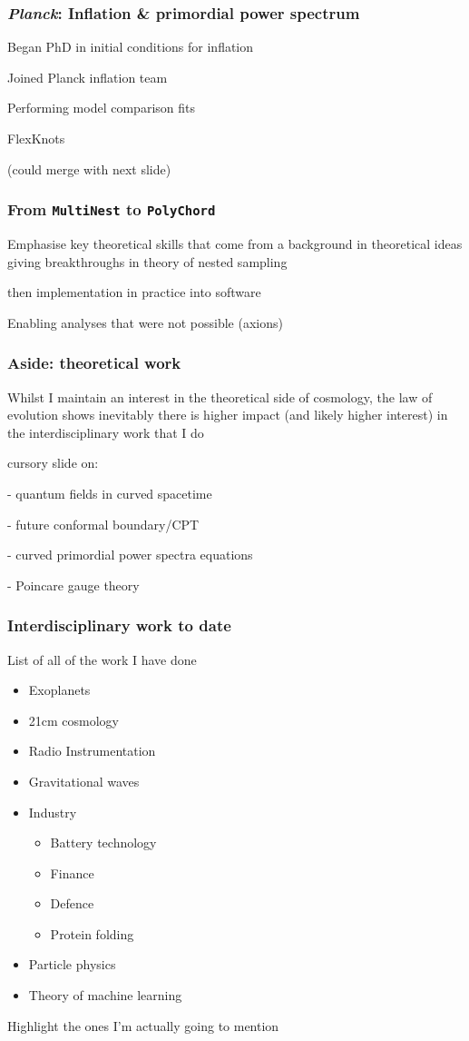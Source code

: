 \documentclass[aspectratio=169]{beamer}
\begin{document}
\begin{frame}
    \frametitle{\textit{Planck}: Inflation \& primordial power spectrum}

    Began PhD in initial conditions for inflation

    Joined Planck inflation team

    Performing model comparison fits 

    FlexKnots

    (could merge with next slide)
\end{frame}

\begin{frame}
    \frametitle{From \texttt{MultiNest} to \texttt{PolyChord}}
    Emphasise key theoretical skills that come from a background in theoretical ideas giving breakthroughs in theory of nested sampling

    then implementation in practice into software

    Enabling analyses that were not possible (axions)
\end{frame}

\begin{frame}
    \frametitle{Aside: theoretical work}

    Whilst I maintain an interest in the theoretical side of cosmology, the law of evolution shows inevitably there is higher impact (and likely higher interest) in the interdisciplinary work that I do

    cursory slide on:

    - quantum fields in curved spacetime

    - future conformal boundary/CPT

    - curved primordial power spectra equations

    - Poincare gauge theory
\end{frame}

\begin{frame}
    \frametitle{Interdisciplinary work to date}

    List of all of the work I have done
    \begin{itemize}
        \item Exoplanets
        \item 21cm cosmology
        \item Radio Instrumentation
        \item Gravitational waves
        \item Industry
            \begin{itemize}
                \item Battery technology
                \item Finance
                \item Defence
                \item Protein folding
            \end{itemize}
        \item Particle physics
        \item Theory of machine learning
    \end{itemize}

    Highlight the ones I'm actually going to mention
\end{frame}
\end{document}
